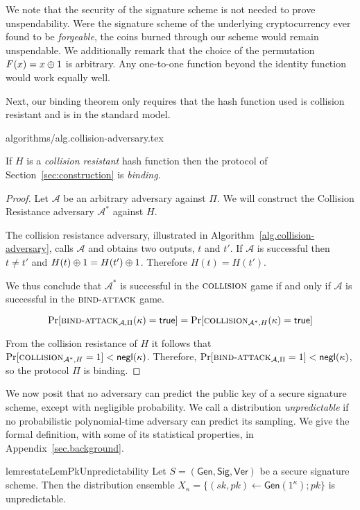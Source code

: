 We note that the security of the signature scheme is not needed to prove unspendability. Were the signature scheme of the underlying cryptocurrency ever found to be \emph{forgeable}, the coins burned through our scheme would remain unspendable. We additionally remark that the
choice of the permutation $F(x) = x \oplus 1$ is arbitrary. Any one-to-one
function beyond the identity function would work equally well.

Next, our binding theorem only requires that the hash function used is collision
resistant and is in the standard model.

{algorithms/alg.collision-adversary.tex}

\begin{theorem}[Binding]
  If $H$ is a \emph{collision resistant} hash function then the protocol of Section~\ref{sec:construction} is \emph{binding}.
\end{theorem}
\begin{proof}
  Let $\mathcal{A}$ be an arbitrary adversary against $\Pi$.
  We will construct the Collision Resistance adversary $\mathcal{A}^*$ against $H$.

  The collision resistance adversary, illustrated in Algorithm~\ref{alg.collision-adversary}, calls $\mathcal{A}$ and obtains two outputs, $t$ and $t'$. If $\mathcal{A}$ is successful then $t \neq t'$ and $H(t) \oplus 1 = H(t') \oplus 1$. Therefore $H(t) = H(t')$.

  We thus conclude that $\mathcal{A^*}$ is successful in the $\textsc{collision}$ game if and only if $\mathcal{A}$ is successful in the $\textsc{bind}\-\text{-}\-\textsc{attack}$ game.

  \[
    \Pr[\textsc{bind}\-\text{-}\-\textsc{attack}_{\mathcal{A},\Pi}(\kappa) = \mathsf{true}]
    =
    \Pr[\textsc{collision}_{\mathcal{A}^*,H}(\kappa) = \mathsf{true}]
  \]

  From the collision resistance of $H$ it follows that $\Pr[\textsc{collision}_{\mathcal{A}^*,H} = 1] < \textsf{negl}(\kappa)$. Therefore,
  $\Pr[\textsc{bind}\-\text{-}\-\textsc{attack}_{\mathcal{A},\Pi} = 1] < \textsf{negl}(\kappa)$, so
  the protocol $\Pi$ is binding.
\end{proof}

We now posit that no adversary can predict the public key of a secure signature scheme, except with negligible probability. We call a distribution \emph{unpredictable} if no
probabilistic polynomial-time adversary can predict its sampling. We give
the formal definition, with some of its statistical properties, in
Appendix~\ref{sec.background}.

\begin{restatable}{lem}{restateLemPkUnpredictability}
  \label{lem:pk-unpredictability}
  Let $S = (\textsf{Gen}, \textsf{Sig}, \textsf{Ver})$ be a secure signature scheme.
  Then the distribution ensemble
  $X_\kappa = \{(sk, pk) \gets \textsf{Gen}(1^\kappa); pk\}$ is
  unpredictable.
\end{restatable}

